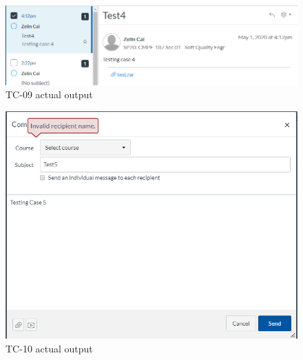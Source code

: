 \documentclass[10pt,letterpaper]{article}
\begin{document}
\begin{figure}[h!]
	\centerline{\includegraphics[width=12cm]{screenshots/tc09-actual-output.png}}
	\caption{TC-09 actual output}
\end{figure}
\begin{figure}[h!]
	\centerline{\includegraphics[width=12cm]{screenshots/tc10-actual-output.png}}
	\caption{TC-10 actual output}
\end{figure}
\end{document}

